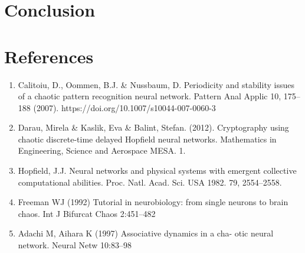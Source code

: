 \documentclass[12pt, letterpaper]{article}
\begin{document}
\section*{Conclusion}


\section*{References}

\fontsize{8}{12}\selectfont

\begin{enumerate}[leftmargin=*]
    \item Calitoiu, D., Oommen, B.J. \& Nussbaum, D. Periodicity and stability issues of a chaotic pattern recognition neural network. Pattern Anal Applic 10, 175–188 (2007). https://doi.org/10.1007/s10044-007-0060-3
    \item Darau, Mirela \& Kaslik, Eva \& Balint, Stefan. (2012). Cryptography using chaotic discrete-time delayed Hopfield neural networks. Mathematics in Engineering, Science and Aerospace MESA. 1.
    \item Hopfield, J.J. Neural networks and physical systems with emergent collective computational abilities.
    Proc. Natl. Acad. Sci. USA 1982. 79, 2554–2558.
    \item Freeman WJ (1992) Tutorial in neurobiology: from single neurons to brain chaos. Int J Bifurcat Chaos 2:451–482
    \item Adachi M, Aihara K (1997) Associative dynamics in a cha- otic neural network. Neural Netw 10:83–98
\end{enumerate}
\end{document}
